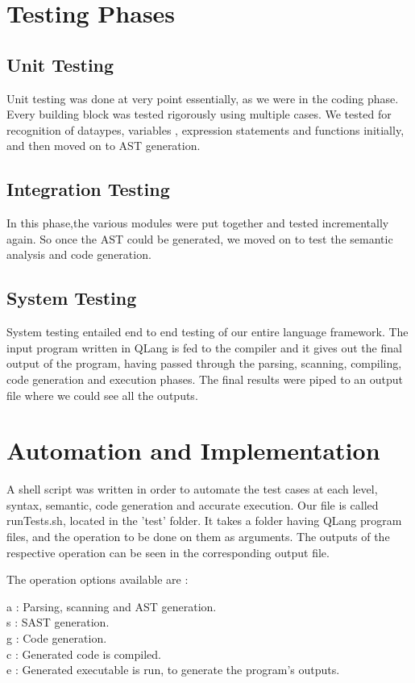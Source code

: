 \section{Testing Phases}

\subsection{Unit Testing}
Unit testing was done at very point essentially, as we were in the coding phase. Every building block was tested rigorously using multiple cases. We tested for recognition of dataypes, variables , expression statements and functions initially, and then moved on to AST generation.

\subsection{Integration Testing}
In this phase,the various modules were put together and tested incrementally again. So once the AST could be generated, we moved on to test the semantic analysis and code generation.

\subsection{System Testing}
System testing entailed end to end testing of our entire language framework. The input program written in QLang is fed to the compiler and it gives out the final output of the program, having passed through the parsing, scanning, compiling, code generation and execution phases. The final results were piped to an output file where we could see all the outputs.


\section{Automation and Implementation}
A shell script was written in order to automate the test cases at each level, syntax, semantic, code
generation and accurate execution. 
Our file is called runTests.sh, located in the 'test' folder. It takes a folder having QLang program files, and the operation to be done on them as arguments. The outputs of the respective operation can be seen in the corresponding output file. 


The operation options available are :

a : Parsing, scanning and AST generation. \\
s : SAST generation.\\
g : Code generation.\\
c : Generated code is compiled.\\
e : Generated executable is run, to generate the program's outputs.\\ 

